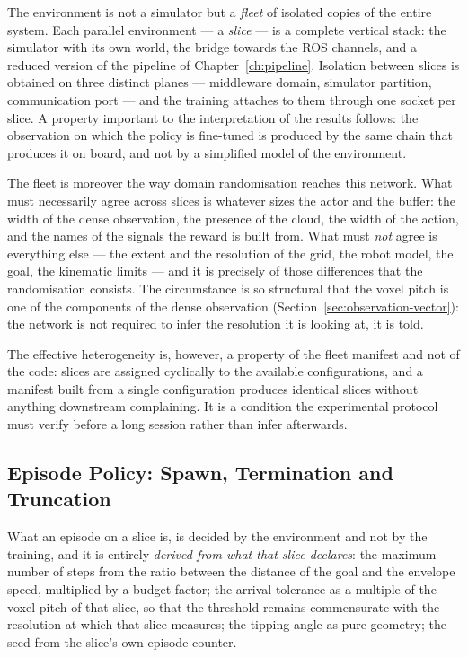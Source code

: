 The environment is not a simulator but a \emph{fleet} of isolated copies of the
entire system. Each parallel environment --- a \emph{slice} --- is a complete
vertical stack: the simulator with its own world, the bridge towards the ROS
channels, and a reduced version of the pipeline of
Chapter~\ref{ch:pipeline}. Isolation between slices is obtained on three
distinct planes --- middleware domain, simulator partition, communication port
--- and the training attaches to them through one socket per slice. A property
important to the interpretation of the results follows: the observation on which
the policy is fine-tuned is produced by the same chain that produces it on board,
and not by a simplified model of the environment.

The fleet is moreover the way domain randomisation reaches this network. What
must necessarily agree across slices is whatever sizes the actor and the buffer:
the width of the dense observation, the presence of the cloud, the width of the
action, and the names of the signals the reward is built from. What must
\emph{not} agree is everything else --- the extent and the resolution of the
grid, the robot model, the goal, the kinematic limits --- and it is precisely of
those differences that the randomisation consists. The circumstance is so
structural that the voxel pitch is one of the components of the dense
observation (Section~\ref{sec:observation-vector}): the network is not required
to infer the resolution it is looking at, it is told.

The effective heterogeneity is, however, a property of the fleet manifest and
not of the code: slices are assigned cyclically to the available configurations,
and a manifest built from a single configuration produces identical slices
without anything downstream complaining. It is a condition the experimental
protocol must verify before a long session rather than infer afterwards.

\subsection{Episode Policy: Spawn, Termination and Truncation}
\label{sec:rl-episodes}

What an episode on a slice is, is decided by the environment and not by the
training, and it is entirely \emph{derived from what that slice declares}: the
maximum number of steps from the ratio between the distance of the goal and the
envelope speed, multiplied by a budget factor; the arrival tolerance as a
multiple of the voxel pitch of that slice, so that the threshold remains
commensurate with the resolution at which that slice measures; the tipping angle
as pure geometry; the seed from the slice's own episode counter.

